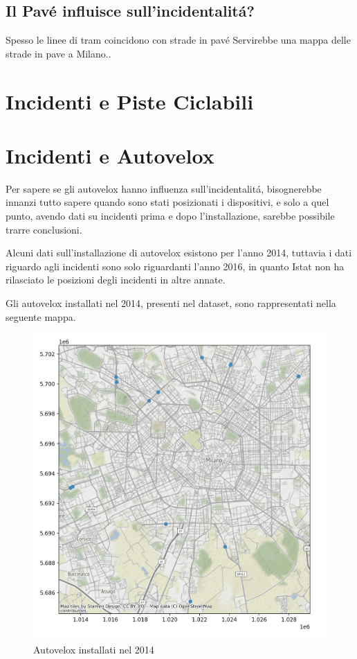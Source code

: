 \documentclass[a4paper]{report}
\begin{document}

\newpage
\subsection{Il Pav\'e influisce sull'incidentalit\'a?} Spesso le linee di tram coincidono con
strade in pav\'e
Servirebbe una mappa delle strade in pave a Milano..

\newpage
\section{Incidenti e Piste  Ciclabili}

\newpage
\section{Incidenti e Autovelox}

Per sapere se gli autovelox hanno influenza sull'incidentalit\'a, 
bisognerebbe innanzi tutto sapere quando sono stati posizionati i dispositivi, e solo a quel punto, 
avendo dati su incidenti prima e dopo l'installazione, sarebbe possibile trarre conclusioni.

Alcuni dati sull'installazione di autovelox esistono per l'anno 2014, tuttavia i dati 
riguardo agli incidenti sono solo riguardanti l'anno 2016, in quanto Istat non ha rilasciato 
le posizioni degli incidenti in altre annate.

Gli autovelox installati nel 2014, presenti nel dataset, sono rappresentati nella seguente mappa.
\begin{figure}[!ht]
    \includegraphics[width=\linewidth]{../src/autovelox/autovelox_2014.png}
    \caption{Autovelox installati nel 2014}
    \label{fig:autovelox_2014}
\end{figure}
\end{document}
